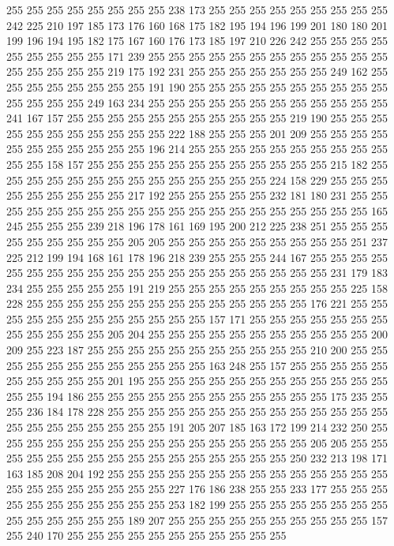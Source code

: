 255 255 255 255 255 255 255 255 238 173 255 255 255 255 255 255 255 255 255 242
225 210 197 185 173 176 160 168 175 182 195 194 196 199 201 180 180 201 199 196
194 195 182 175 167 160 176 173 185 197 210 226 242 255 255 255 255 255 255 255
255 255 171 239 255 255 255 255 255 255 255 255 255 255 255 255 255 255 255 255
255 219 175 192 231 255 255 255 255 255 255 255 249 162 255 255 255 255 255 255
255 255 191 190 255 255 255 255 255 255 255 255 255 255 255 255 255 255 249 163
234 255 255 255 255 255 255 255 255 255 255 255 255 241 167 157 255 255 255 255
255 255 255 255 255 255 255 219 190 255 255 255 255 255 255 255 255 255 255 255
222 188 255 255 255 201 209 255 255 255 255 255 255 255 255 255 255 255 196 214
255 255 255 255 255 255 255 255 255 255 255 255 158 157 255 255 255 255 255 255
255 255 255 255 255 255 215 182 255 255 255 255 255 255 255 255 255 255 255 255
255 255 224 158 229 255 255 255 255 255 255 255 255 255 217 192 255 255 255 255
255 232 181 180 231 255 255 255 255 255 255 255 255 255 255 255 255 255 255 255
255 255 255 255 255 165 245 255 255 255 239 218 196 178 161 169 195 200 212 225
238 251 255 255 255 255 255 255 255 255 255 205 205 255 255 255 255 255 255 255
255 255 251 237 225 212 199 194 168 161 178 196 218 239 255 255 255 244 167 255
255 255 255 255 255 255 255 255 255 255 255 255 255 255 255 255 255 255 255 231
179 183 234 255 255 255 255 255 191 219 255 255 255 255 255 255 255 255 255 225
158 228 255 255 255 255 255 255 255 255 255 255 255 255 255 255 176 221 255 255
255 255 255 255 255 255 255 255 255 255 157 171 255 255 255 255 255 255 255 255
255 255 255 255 205 204 255 255 255 255 255 255 255 255 255 255 255 200 209 255
223 187 255 255 255 255 255 255 255 255 255 255 255 210 200 255 255 255 255 255
255 255 255 255 255 255 255 163 248 255 157 255 255 255 255 255 255 255 255 255
255 201 195 255 255 255 255 255 255 255 255 255 255 255 255 255 255 194 186 255
255 255 255 255 255 255 255 255 255 255 255 175 235 255 255 236 184 178 228 255
255 255 255 255 255 255 255 255 255 255 255 255 255 255 255 255 255 255 255 255
255 191 205 207 185 163 172 199 214 232 250 255 255 255 255 255 255 255 255 255
255 255 255 255 255 255 255 205 205 255 255 255 255 255 255 255 255 255 255 255
255 255 255 255 255 250 232 213 198 171 163 185 208 204 192 255 255 255 255 255
255 255 255 255 255 255 255 255 255 255 255 255 255 255 255 255 255 227 176 186
238 255 255 233 177 255 255 255 255 255 255 255 255 255 255 255 253 182 199 255
255 255 255 255 255 255 255 255 255 255 255 255 255 189 207 255 255 255 255 255
255 255 255 255 255 157 255 240 170 255 255 255 255 255 255 255 255 255 255 255
